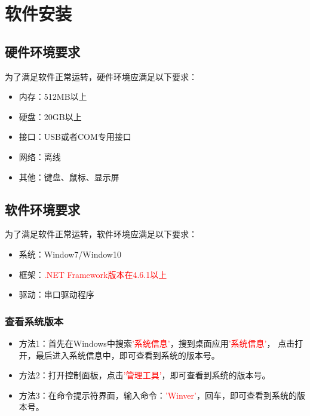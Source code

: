 \chapter{软件安装}
\section{硬件环境要求}
为了满足软件正常运转，硬件环境应满足以下要求：
\begin{itemize}
    \item  内存：512MB以上
    \item  硬盘：20GB以上
    \item  接口：USB或者COM专用接口
    \item  网络：离线
    \item  其他：键盘、鼠标、显示屏
\end{itemize}

\section{软件环境要求}
为了满足软件正常运转，软件环境应满足以下要求：
\begin{itemize}
    \item  系统：Window7/Window10
    \item  框架：\textcolor{red}{.NET Framework版本在4.6.1以上}
    \item  驱动：串口驱动程序
\end{itemize}
\subsection{查看系统版本}
\begin{itemize}
    \item 方法1：首先在Windows中搜索\textcolor{red}{'系统信息'}，搜到桌面应用\textcolor{red}{'系统信息'}，
点击打开，最后进入系统信息中，即可查看到系统的版本号。
    \item 方法2：打开控制面板，点击\textcolor{red}{'管理工具'}，即可查看到系统的版本号。
    \item 方法3：在命令提示符界面，输入命令：\textcolor{red}{'Winver'}，回车，即可查看到系统的版本号。
\end{itemize}
